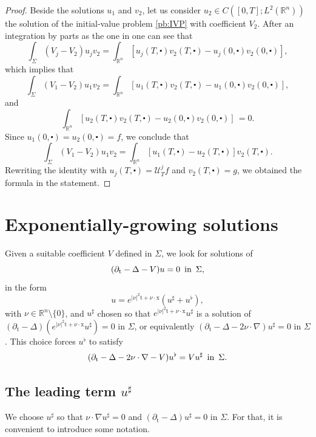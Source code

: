 \documentclass[10pt,a4paper]{amsart}
\theoremstyle{remark}
\theoremstyle{definition}
\newcommand{\R}{\mathbb{R}}
\newcommand{\tm}{\mathrm{t}}
\newcommand{\x}{\mathrm{x}}
\newcommand{\marnote}[1]{\marginpar{\footnotesize #1}} %
\begin{document}
\begin{proof}
Beside the solutions $u_1$ and $v_2$, let us consider $u_2 \in C([0,T]; L^2(\R^n))$ the 
solution of the initial-value problem \eqref{pb:IVP} with coefficient $V_2$. After an
integration by parts as the one in  one can see that
\[\int_\Sigma (V_j - V_2) u_j v_2 = \int_{\R^n} [u_j(T, \centerdot) v_2 (T, \centerdot) - u_j(0, \centerdot) v_2 (0, \centerdot)],\]
which implies that
\[\int_\Sigma (V_1 - V_2) u_1 v_2 = \int_{\R^n} [u_1(T, \centerdot) v_2 (T, \centerdot) - u_1(0, \centerdot) v_2 (0, \centerdot)],\]
and
\[\int_{\R^n} [u_2(T, \centerdot) v_2 (T, \centerdot) - u_2(0, \centerdot) v_2 (0, \centerdot)] \, = 0. \]
Since $u_1(0, \centerdot) = u_2(0, \centerdot) = f$, we conclude that
\[\int_\Sigma (V_1 - V_2) u_1 v_2 = \int_{\R^n} [u_1(T, \centerdot) - u_2(T, \centerdot)] v_2 (T, \centerdot).\]
Rewriting the identity with $u_j(T, \centerdot) = \mathcal{U}_T^j f$ and 
$v_2(T, \centerdot) = g$, we obtained the formula in the statement.
\end{proof}


\section{Exponentially-growing solutions}\label{sec:CGO}
Given a suitable coefficient $V$ defined in $\Sigma$,
we look for solutions of
\begin{equation}
(\partial_\tm - \Delta - V) u = 0 \enspace \textnormal{in} \enspace \Sigma,
\label{eq:heat}
\end{equation}
in the form
\begin{equation}
\label{id:GO}
u = e^{|\nu|^2 \tm + \nu \cdot \x} (u^\sharp + u^\flat),
\end{equation}
with $\nu \in \R^n \setminus \{ 0 \}$, and
$u^\sharp$ chosen so that $e^{|\nu|^2 \tm + \nu \cdot \x} u^\sharp$ is a solution of 
$(\partial_\tm - \Delta) (e^{|\nu|^2 \tm + \nu \cdot \x} u^\sharp) = 0$ in $\Sigma$,
or equivalently $(\partial_\tm - \Delta - 2 \nu \cdot \nabla) u^\sharp = 0 $ in
$\Sigma$. This choice forces $u^\flat$ to satisfy
\begin{equation}
(\partial_\tm - \Delta - 2 \nu \cdot \nabla - V) u^\flat = V u^\sharp \enspace \textnormal{in} \enspace \Sigma.
\label{eq:remainder-equation}
\end{equation}

\subsection{The leading term \texorpdfstring{$u^\sharp$}{usharp}}
We choose $u^\sharp$ so that $\nu \cdot \nabla u^\sharp = 0$ and $(\partial_\tm - \Delta) u^\sharp = 0$ in $\Sigma$. For that, it is convenient to introduce some notation.
\end{document}
